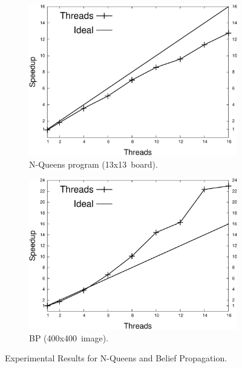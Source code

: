 \begin{figure}[h]
   \vspace{-0.1\intextsep}
   \centering
   \begin{subfigure}[b]{\plotsize}
      \includegraphics[width=\textwidth]{speedup_8queens-13.pdf}
      \caption{N-Queens program (13x13~board).}
      \label{exp:8queens}
   \end{subfigure}
   \begin{subfigure}[b]{\plotsize}
      \includegraphics[width=\textwidth]{speedup_bp-400.pdf}
      \caption{BP (400x400~image).}
      \label{exp:bp}
   \end{subfigure}
   \caption{Experimental Results for N-Queens and Belief Propagation.}
   \vspace{-0.8\intextsep}
\end{figure}

